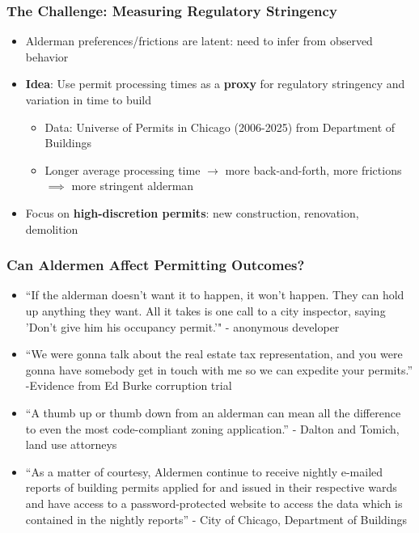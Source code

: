 \begin{frame}
	\frametitle{The Challenge: Measuring Regulatory Stringency}
	\begin{itemize}
		\item Alderman preferences/frictions are latent: need to infer from observed behavior
		\item \textbf{Idea}: Use permit processing times as a \textbf{proxy} for regulatory stringency and variation in time to build
		\begin{itemize}
			\item Data: Universe of Permits in Chicago (2006-2025) from Department of Buildings
			\item Longer average processing time $\rightarrow$ more back-and-forth, more frictions $\implies$ more stringent alderman 
		\end{itemize}
		\item Focus on \textbf{high-discretion permits}: new construction, renovation, demolition
	\end{itemize}
\end{frame}


\begin{frame}[label=permits-quotes]
   \frametitle{Can Aldermen Affect Permitting Outcomes?} 
   \begin{itemize}
    \item ``If the alderman doesn't want it to happen, it won't happen. They can hold up anything they want.
 All it takes is one call to a city inspector, saying 'Don't give him his occupancy permit.'" - anonymous developer
 \item ``We were gonna talk about the real estate tax representation, and you were gonna have somebody get in touch with me so we can expedite your permits.'' -Evidence from Ed Burke corruption trial
 \item ``A thumb up or thumb down from an alderman can mean all the difference to even the most code-compliant zoning application.'' - Dalton and Tomich, land use attorneys
 \item ``As a matter of courtesy,
Aldermen continue to receive nightly e-mailed reports of building permits applied for and issued in their respective
wards and have access to a password-protected website to access the data which is contained in the nightly reports'' - City of Chicago, Department of Buildings
   \end{itemize}
\end{frame}

